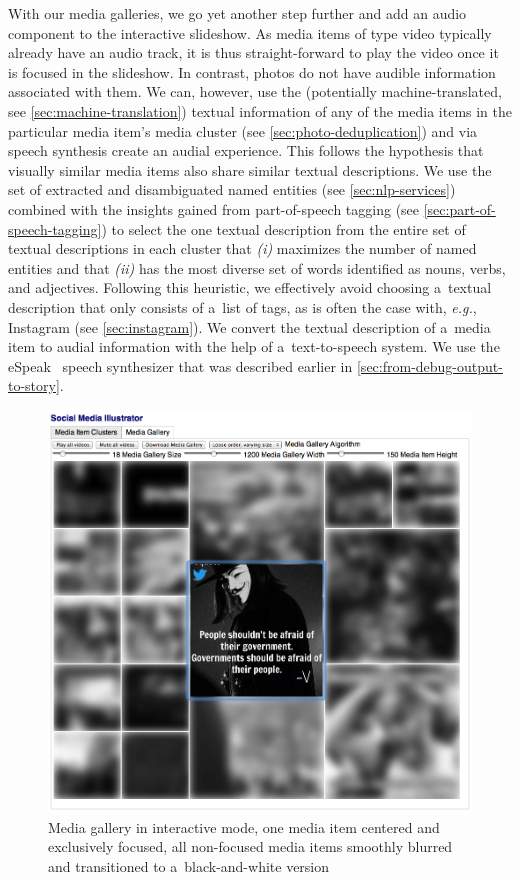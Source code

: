With our media galleries, we go yet another step further
and add an audio component to the interactive slideshow.
As media items of type video typically already have an audio track,
it is thus straight-forward to play the video once it is focused
in the slideshow.
In contrast, photos do not have audible information associated with them.
We can, however, use the (potentially machine-translated,
see \autoref{sec:machine-translation}) textual information
of any of the media items in the particular media item's media cluster
(see \autoref{sec:photo-deduplication})
and via speech synthesis create an audial experience.
This follows the hypothesis that visually similar media items
also share similar textual descriptions.
We use the set of extracted and disambiguated named entities
(see \autoref{sec:nlp-services}) combined with
the insights gained from part-of-speech tagging
(see \autoref{sec:part-of-speech-tagging})
to select the one textual description
from the entire set of textual descriptions in each cluster
that \textit{(i)} maximizes the number of named entities
and that \textit{(ii)} has the most diverse set of words
identified as nouns, verbs, and adjectives.
Following this heuristic, we effectively avoid choosing
a~textual description that only consists of a~list of tags,
as is often the case with, \emph{e.g.},
Instagram (see \autoref{sec:instagram}).
We convert the textual description of a~media item
to audial information with the help of a~text-to-speech system.
We use the eSpeak~\cite{duddington2012espeak} speech synthesizer
that was described earlier in \autoref{sec:from-debug-output-to-story}.

\begin{figure}[!ht]
  \centering
  \includegraphics[width=1\columnwidth]{occupygezi1.png}
  \caption[Media gallery in interactive mode]{Media gallery in interactive mode, one media item centered and exclusively focused, all non-focused media items smoothly blurred and transitioned to a~black-and-white version}
  \label{fig:occupygezi1}
\end{figure}

